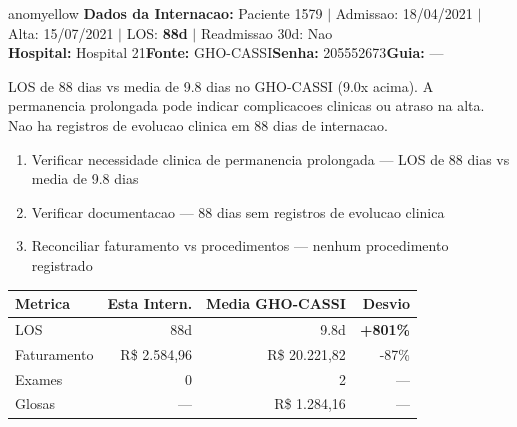 \documentclass[a4paper,10pt]{article}
\begin{document}
\newpage

\begin{anomalycard}[Internacao 1361 | GHO-CASSI | MODERADO (z=2.22)]{anomyellow}
\textbf{Dados da Internacao:} Paciente 1579 $\mid$ Admissao: 18/04/2021 $\mid$ Alta: 15/07/2021 $\mid$ LOS: \textbf{88d} $\mid$ Readmissao 30d: Nao\\
\textbf{Hospital:} Hospital 21\quad\textbf{Fonte:} GHO-CASSI\quad\textbf{Senha:} 205552673\quad\textbf{Guia:} ---\\
\vspace{2pt}\begin{tcolorbox}[colback=severityred!20,colframe=anomyellow,title={\textbf{Interpretacao de Negocio}},fonttitle=\bfseries\small,left=4pt,right=4pt,top=3pt,bottom=3pt]
{\small LOS de 88 dias vs media de 9.8 dias no GHO-CASSI (9.0x acima). A permanencia prolongada pode indicar complicacoes clinicas ou atraso na alta. Nao ha registros de evolucao clinica em 88 dias de internacao.}
\end{tcolorbox}
\begin{tcolorbox}[colback=severityyellow!30,colframe=anomorange,title={\textbf{Recomendacoes Especificas}},fonttitle=\bfseries\small,left=4pt,right=4pt,top=3pt,bottom=3pt]
\begin{enumerate}[nosep,leftmargin=16pt]
\item {\small Verificar necessidade clinica de permanencia prolongada --- LOS de 88 dias vs media de 9.8 dias}
\item {\small Verificar documentacao --- 88 dias sem registros de evolucao clinica}
\item {\small Reconciliar faturamento vs procedimentos --- nenhum procedimento registrado}
\end{enumerate}
\end{tcolorbox}
\begin{center}\begin{tabular}{l r r r}\toprule\textbf{Metrica} & \textbf{Esta Intern.} & \textbf{Media GHO-CASSI} & \textbf{Desvio} \\\midrule
LOS & 88d & 9.8d & \textcolor{anomred}{\textbf{+801\%}} \\
Faturamento & R\$ 2.584,96 & R\$ 20.221,82 & -87\% \\
Exames & 0 & 2 & --- \\
Glosas & --- & R\$ 1.284,16 & --- \\
\bottomrule\end{tabular}\end{center}


\end{anomalycard}
\end{document}
